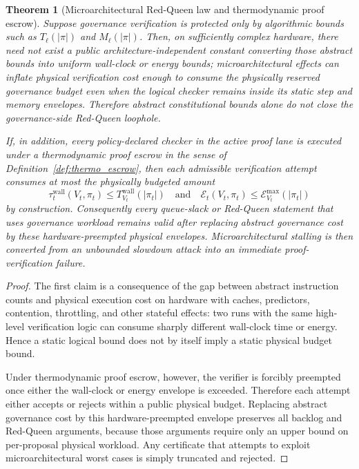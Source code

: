 \documentclass[11pt]{article}
\newtheorem{theorem}{Theorem}[section]
\theoremstyle{definition}
\newcommand{\1}{\mathbf{1}}
\begin{document}
\begin{theorem}[Microarchitectural Red-Queen law and thermodynamic proof escrow]\label{thm:thermo_escrow}
Suppose governance verification is protected only by algorithmic bounds such as $T_\ell(|\pi|)$ and $M_\ell(|\pi|)$. Then, on sufficiently complex hardware, there need not exist a public architecture-independent constant converting those abstract bounds into uniform wall-clock or energy bounds; microarchitectural effects can inflate physical verification cost enough to consume the physically reserved governance budget even when the logical checker remains inside its static step and memory envelopes. Therefore abstract constitutional bounds alone do not close the governance-side Red-Queen loophole.

If, in addition, every policy-declared checker in the active proof lane is executed under a thermodynamic proof escrow in the sense of Definition~\ref{def:thermo_escrow}, then each admissible verification attempt consumes at most the physically budgeted amount
\[
\tau_t^{\mathrm{wall}}(V_t,\pi_t) \le T_{V_t}^{\mathrm{wall}}(|\pi_t|)
\quad\text{and}\quad
\mathcal E_t(V_t,\pi_t) \le \mathcal E_{V_t}^{\max}(|\pi_t|)
\]
by construction. Consequently every queue-slack or Red-Queen statement that uses governance workload remains valid after replacing abstract governance cost by these hardware-preempted physical envelopes. Microarchitectural stalling is then converted from an unbounded slowdown attack into an immediate proof-verification failure.
\end{theorem}

\begin{proof}
The first claim is a consequence of the gap between abstract instruction counts and physical execution cost on hardware with caches, predictors, contention, throttling, and other stateful effects: two runs with the same high-level verification logic can consume sharply different wall-clock time or energy. Hence a static logical bound does not by itself imply a static physical budget bound.

Under thermodynamic proof escrow, however, the verifier is forcibly preempted once either the wall-clock or energy envelope is exceeded. Therefore each attempt either accepts or rejects within a public physical budget. Replacing abstract governance cost by this hardware-preempted envelope preserves all backlog and Red-Queen arguments, because those arguments require only an upper bound on per-proposal physical workload. Any certificate that attempts to exploit microarchitectural worst cases is simply truncated and rejected.
\end{proof}
\end{document}
